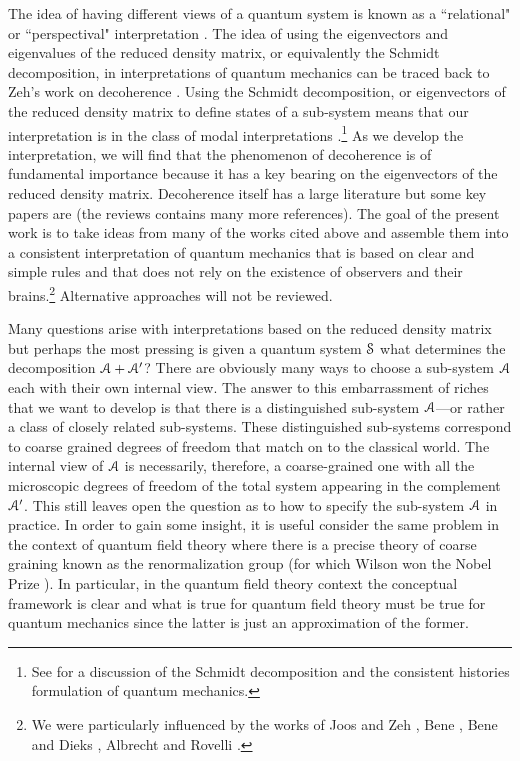 \documentclass[12pt]{article}
\def\BS{{\EuScript S}}
\def\BA{{\EuScript A}}
\begin{document}
The idea of having different views of a quantum system is known as  a ``relational" or ``perspectival" interpretation \cite{Rov,Dk1,BD1}.  The idea of using the eigenvectors and eigenvalues of the reduced density matrix, or equivalently the Schmidt decomposition, in interpretations of quantum mechanics can be traced back to Zeh's work on decoherence \cite{Zeh70,Zeh73, Zeh00,Zeh05}. Using the Schmidt decomposition, or eigenvectors of the reduced density matrix to 
define states of a sub-system means that our interpretation is in the class of 
modal interpretations \cite{Barvinsky:1995va,Bene:1997mf,Bene:1997nd,Bene:1997kk,DV1,DV2,B1,Bu1,D1,D2,V1,Albrecht:1992rs,Albrecht:1992uc}.\footnote{See \cite{Kent:1996kx} for a discussion of the Schmidt decomposition and the consistent histories formulation of quantum mechanics.} As we develop the interpretation, we will find that 
the phenomenon of decoherence is 
of fundamental importance because it has a key bearing on the eigenvectors of the reduced density matrix. 
Decoherence itself has a large literature but some key papers are 
\cite{Zurek:1982ii,Caldeira:1982iu,Joos:1984uk,Zeh:1986ix,Unruh:1989dd,Zurek81,Zurek91,PHZ,ZHP,Zurek93,TS,ZP,GKZ,Gallis,AZ,APZ,Zurek98a,HSZ,Zurek98b,PZ2,Zeh99,BGJKS,Zurek03,KZ,Zeh10}
(the reviews \cite{JZKGKS,Schlosshauer:2003zy} contains many more references).
The goal of the present work is to take ideas from many of the works cited above and assemble them into a consistent interpretation of quantum mechanics that is based on clear and simple rules and that does not rely on the existence of observers and their brains.\footnote{We were particularly influenced by the works of Joos and Zeh \cite{Joos:1984uk}, Bene \cite{Bene:1997mf,Bene:1997nd,Bene:1997kk}, Bene and Dieks \cite{BD1}, Albrecht \cite{Albrecht:1992rs,Albrecht:1992uc} and Rovelli \cite{Rov}.} Alternative approaches will not be reviewed.

Many questions arise with interpretations based on the reduced density matrix but perhaps the most pressing is given a quantum system $\BS$ what determines the decomposition $\BA+\BA'$? There are obviously many ways to choose a sub-system $\BA$ each with their own internal view. The answer to this embarrassment of riches that we want to develop is that there is a distinguished sub-system $\BA$---or rather a class of closely related sub-systems.
These distinguished sub-systems correspond to coarse grained degrees of freedom
that match on to the classical world. The internal view of $\BA$ is necessarily, therefore, a coarse-grained one with all the microscopic degrees of freedom of the total system appearing in the complement $\BA'$. This still leaves open the question as to how to specify the 
sub-system $\BA$ in practice. In order to gain some insight, 
it is useful consider the same problem in the context of quantum field theory where there is a precise theory of coarse graining known as the renormalization group (for which Wilson won the Nobel Prize \cite{Wilson:1983}). In particular, in the quantum field theory context the conceptual framework is clear and what is true for quantum field theory must be true for quantum mechanics since the latter is just an approximation of the former.
\end{document}
